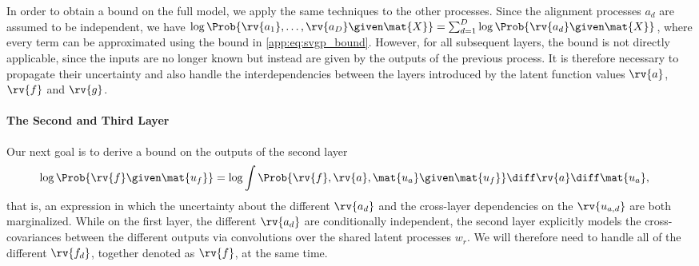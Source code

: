 \documentclass{article}
\begin{document}
In order to obtain a bound on the full model, we apply the same techniques to the other processes.
Since the alignment processes $a_d$ are assumed to be independent, we have $\log \Prob{\rv{a_1}, \dots, \rv{a_D} \given \mat{X}} = \sum_{d=1}^D \log \Prob{\rv{a_d} \given \mat{X}}$, where every term can be approximated using the bound in \cref{app:eq:svgp_bound}.
However, for all subsequent layers, the bound is not directly applicable, since the inputs are no longer known but instead are given by the outputs of the previous process.
It is therefore necessary to propagate their uncertainty and also handle the interdependencies between the layers introduced by the latent function values $\rv{a}$, $\rv{f}$ and $\rv{g}$.

\paragraph{The Second and Third Layer}
\label{app:subsubsec:other_layers}
Our next goal is to derive a bound on the outputs of the second layer
\begin{align}
\begin{split}
    \log \Prob{\rv{f} \given \mat{u_f}} &= \log \int \Prob{\rv{f}, \rv{a}, \mat{u_a} \given \mat{u_f}} \diff \rv{a} \diff \mat{u_a},
\end{split}
\end{align}
that is, an expression in which the uncertainty about the different $\rv{a_d}$  and the cross-layer dependencies on the $\rv{u_{a, d}}$ are both marginalized.
While on the first layer, the different $\rv{a_d}$ are conditionally independent, the second layer explicitly models the cross-covariances between the different outputs via convolutions over the shared latent processes $w_r$.
We will therefore need to handle all of the different $\rv{f_d}$, together denoted as $\rv{f}$, at the same time.
\end{document}
